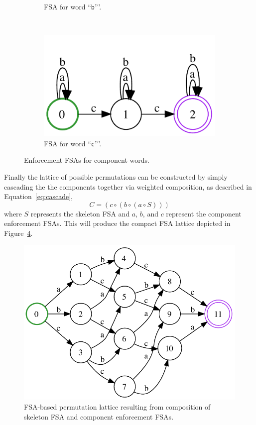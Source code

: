 \documentclass[12pt]{article}
\begin{document}
\begin{figure}
\begin{subfigure}[b]{0.25\textwidth}
                \caption{FSA for word ``\texttt{b}'''.}
                \label{fig:cmp2}
        \end{subfigure}
        ~ %
        \begin{subfigure}[b]{0.4\textwidth}
                \centering
                \includegraphics[width=\textwidth]{cmp3}
                \caption{FSA for word ``\texttt{c}'''.}
                \label{fig:cmp3}
        \end{subfigure}
        \caption{Enforcement FSAs for component words.}\label{fig:enforcers}
\end{figure}
Finally the lattice of possible permutations can be constructed by simply cascading the the components together via weighted composition, as described in Equation~\ref{eq:cascade},
\begin{equation}\label{eq:cascade}
 C = (c\circ (b\circ (a\circ S)))
\end{equation}
where $S$ represents the skeleton FSA and $a$, $b$, and $c$ represent the component enforcement FSAs.  This will produce the compact FSA lattice depicted in Figure~\ref{fig:cascade}.
\begin{figure}[h!]
\begin{center}
\includegraphics[width=.7\textwidth]{cascade}
\end{center}
\caption{FSA-based permutation lattice resulting from composition of skeleton FSA and component enforcement FSAs.}
\label{fig:cascade}
\end{figure}
\end{document}
